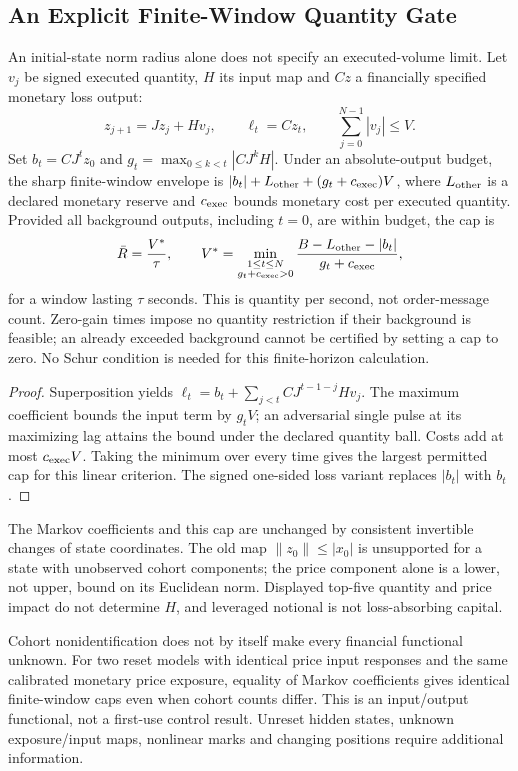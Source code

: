 \documentclass[12pt]{article}
\theoremstyle{definition}
\theoremstyle{remark}
\begin{document}
\subsection{An Explicit Finite-Window Quantity Gate}
An initial-state norm radius alone does not specify an executed-volume limit. Let $v_j$ be signed executed quantity, $H$ its input map and $Cz$ a financially specified monetary loss output:
\[
z_{j+1}=Jz_j+Hv_j,\qquad \ell_t=Cz_t,
\qquad \sum_{j=0}^{N-1}|v_j|\le V.
\]
Set $b_t=CJ^tz_0$ and $g_t=\max_{0\le k<t}|CJ^kH|$. Under an absolute-output budget, the sharp finite-window envelope is $|b_t|+L_{\rm other}+(g_t+c_{\rm exec})V$, where $L_{\rm other}$ is a declared monetary reserve and $c_{\rm exec}$ bounds monetary cost per executed quantity. Provided all background outputs, including $t=0$, are within budget, the cap is
\begin{equation}
\bar R=\frac{V^*}{\tau},\qquad
V^*=\min_{\substack{1\le t\le N\\g_t+c_{\rm exec}>0}}
\frac{B-L_{\rm other}-|b_t|}{g_t+c_{\rm exec}},
\label{eq:rate_gating_rule}
\end{equation}
for a window lasting $\tau$ seconds. This is quantity per second, not order-message count. Zero-gain times impose no quantity restriction if their background is feasible; an already exceeded background cannot be certified by setting a cap to zero. No Schur condition is needed for this finite-horizon calculation.

\begin{proof}
Superposition yields $\ell_t=b_t+\sum_{j<t}CJ^{t-1-j}Hv_j$. The maximum coefficient bounds the input term by $g_tV$; an adversarial single pulse at its maximizing lag attains the bound under the declared quantity ball. Costs add at most $c_{\rm exec}V$. Taking the minimum over every time gives the largest permitted cap for this linear criterion. The signed one-sided loss variant replaces $|b_t|$ with $b_t$.
\end{proof}

The Markov coefficients and this cap are unchanged by consistent invertible changes of state coordinates. The old map $\|z_0\|\le|x_0|$ is unsupported for a state with unobserved cohort components; the price component alone is a lower, not upper, bound on its Euclidean norm. Displayed top-five quantity and price impact do not determine $H$, and leveraged notional is not loss-absorbing capital.

Cohort nonidentification does not by itself make every financial functional unknown. For two reset models with identical price input responses and the same calibrated monetary price exposure, equality of Markov coefficients gives identical finite-window caps even when cohort counts differ. This is an input/output functional, not a first-use control result. Unreset hidden states, unknown exposure/input maps, nonlinear marks and changing positions require additional information.
\end{document}
